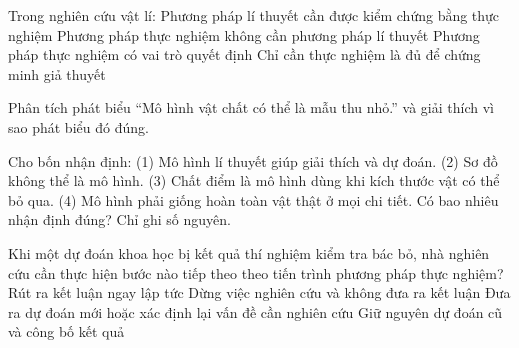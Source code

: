 \begin{ex}
Trong nghiên cứu vật lí:
\choiceTF
{\True Phương pháp lí thuyết cần được kiểm chứng bằng thực nghiệm}
{Phương pháp thực nghiệm không cần phương pháp lí thuyết}
{\True Phương pháp thực nghiệm có vai trò quyết định}
{Chỉ cần thực nghiệm là đủ để chứng minh giả thuyết}
\end{ex}

\begin{bt}
Phân tích phát biểu “Mô hình vật chất có thể là mẫu thu nhỏ.” và giải thích vì sao phát biểu đó đúng.
\end{bt}

\begin{ex}
Cho bốn nhận định: (1) Mô hình lí thuyết giúp giải thích và dự đoán. (2) Sơ đồ không thể là mô hình. (3) Chất điểm là mô hình dùng khi kích thước vật có thể bỏ qua. (4) Mô hình phải giống hoàn toàn vật thật ở mọi chi tiết. Có bao nhiêu nhận định đúng? Chỉ ghi số nguyên.
\end{ex}

\begin{ex}
Khi một dự đoán khoa học bị kết quả thí nghiệm kiểm tra bác bỏ, nhà nghiên cứu cần thực hiện bước nào tiếp theo theo tiến trình phương pháp thực nghiệm?
\choice
{Rút ra kết luận ngay lập tức}
{Dừng việc nghiên cứu và không đưa ra kết luận}
{\True Đưa ra dự đoán mới hoặc xác định lại vấn đề cần nghiên cứu}
{Giữ nguyên dự đoán cũ và công bố kết quả}
\end{ex}

